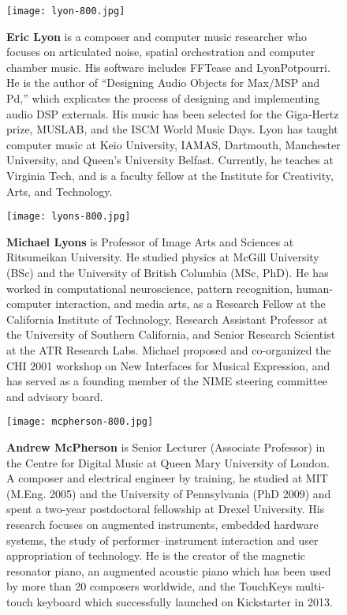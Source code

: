 \begin{authbio}
\begin{figure}[H]
  \sidecaption[t]
  \texttt{[image: lyon-800.jpg]}
  \caption{\textbf{Eric Lyon} is a composer and computer music researcher who focuses on articulated noise, spatial orchestration and computer chamber music. His software includes FFTease and LyonPotpourri. He is the author of ``Designing Audio Objects for Max/MSP and Pd,'' which explicates the process of designing and implementing audio DSP externals. His music has been selected for the Giga-Hertz prize, MUSLAB, and the ISCM World Music Days. Lyon has taught computer music at Keio University, IAMAS, Dartmouth, Manchester University, and Queen’s University Belfast. Currently, he teaches at Virginia Tech, and is a faculty fellow at the Institute for Creativity, Arts, and Technology.}
\end{figure}

\begin{figure}[H]
  \sidecaption[t]
  \texttt{[image: lyons-800.jpg]}
  \caption{\textbf{Michael Lyons} is Professor of Image Arts and Sciences at Ritsumeikan University. He studied physics at McGill University (BSc) and the University of British Columbia (MSc, PhD). He has worked in computational neuroscience, pattern recognition, human-computer interaction, and media arts, as a Research Fellow at the California Institute of Technology, Research Assistant Professor at the University of Southern California, and Senior Research Scientist at the ATR Research Labs. Michael proposed and co-organized the CHI 2001 workshop on New Interfaces for Musical Expression, and has served as a founding member of the NIME steering committee and advisory board.}
\end{figure}

\begin{figure}[H]
  \sidecaption[t]
  \texttt{[image: mcpherson-800.jpg]}
  \caption{\textbf{Andrew McPherson} is Senior Lecturer (Associate Professor) in the Centre for Digital Music at Queen Mary University of London. A composer and electrical engineer by training, he studied at MIT (M.Eng. 2005) and the University of Pennsylvania (PhD 2009) and spent a two-year postdoctoral fellowship at Drexel University. His research focuses on augmented instruments, embedded hardware systems, the study of performer--instrument interaction and user appropriation of technology. He is the creator of the magnetic resonator piano, an augmented acoustic piano which has been used by more than 20 composers worldwide, and the TouchKeys multi-touch keyboard which successfully launched on Kickstarter in 2013.}
\end{figure}


\end{authbio}
